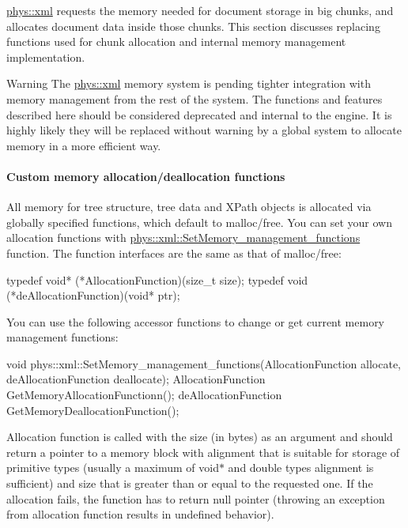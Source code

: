 \hyperlink{namespacephys_1_1xml}{phys::xml} requests the memory needed for document storage in big chunks, and allocates document data inside those chunks. This section discusses replacing functions used for chunk allocation and internal memory management implementation. \par
 \par
 \begin{DoxyWarning}{Warning}
The \hyperlink{namespacephys_1_1xml}{phys::xml} memory system is pending tighter integration with memory management from the rest of the system. The functions and features described here should be considered deprecated and internal to the engine. It is highly likely they will be replaced without warning by a global system to allocate memory in a more efficient way.
\end{DoxyWarning}
\par
 \par
 \hypertarget{XMLManual_XMLCustomAlloc}{}\paragraph{Custom memory allocation/deallocation functions}\label{XMLManual_XMLCustomAlloc}
All memory for tree structure, tree data and XPath objects is allocated via globally specified functions, which default to malloc/free. You can set your own allocation functions with \hyperlink{namespacephys_1_1xml_a2ad88e4331ac29a86c99d5e40b31f983}{phys::xml::SetMemory\_\-management\_\-functions} function. The function interfaces are the same as that of malloc/free: 
\begin{DoxyCode}
 typedef void* (*AllocationFunction)(size_t size);
 typedef void (*deAllocationFunction)(void* ptr);
\end{DoxyCode}
 You can use the following accessor functions to change or get current memory management functions: 
\begin{DoxyCode}
 void phys::xml::SetMemory_management_functions(AllocationFunction allocate, 
      deAllocationFunction deallocate);
 AllocationFunction GetMemoryAllocationFunctionn();
 deAllocationFunction GetMemoryDeallocationFunction();
\end{DoxyCode}
 Allocation function is called with the size (in bytes) as an argument and should return a pointer to a memory block with alignment that is suitable for storage of primitive types (usually a maximum of void$\ast$ and double types alignment is sufficient) and size that is greater than or equal to the requested one. If the allocation fails, the function has to return null pointer (throwing an exception from allocation function results in undefined behavior). \par
